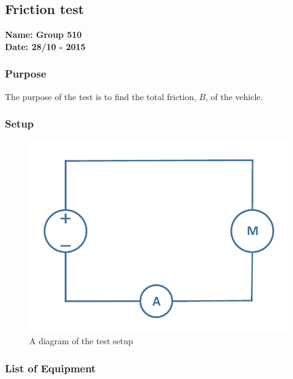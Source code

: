 \pagebreak
\subsection{Friction test} %
\textbf{Name: Group 510}\\
\textbf{Date: 28/10 - 2015}

\subsubsection{Purpose}
The purpose of the test is to find the total friction, $B$, of the vehicle.

\subsubsection{Setup}
\begin{figure}[H]
  \centering
	\includegraphics[scale=0.5]{figures/FrictionTest.pdf}
	\caption{A diagram of the test setup}
\end{figure}

\subsubsection{List of Equipment}


